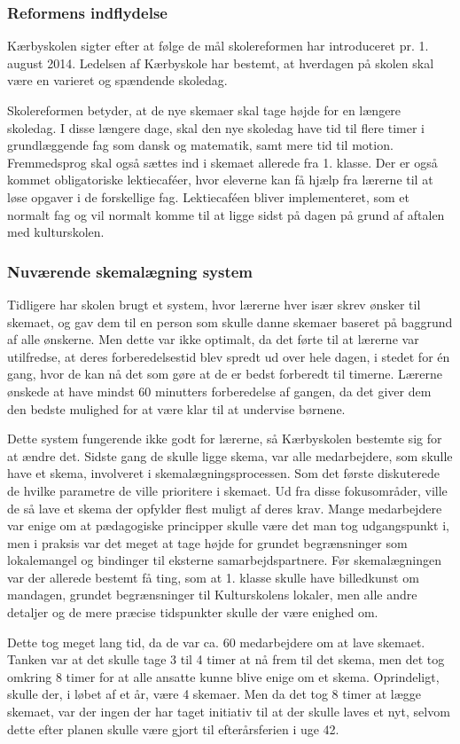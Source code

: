 \subsubsection{Reformens indflydelse}
\label{Reformens_indflydelse}
Kærbyskolen sigter efter at følge de mål skolereformen har introduceret pr. 1. august 2014. Ledelsen af Kærbyskole har bestemt, at hverdagen på skolen skal være en varieret og spændende skoledag.

Skolereformen betyder, at de nye skemaer skal tage højde for en længere skoledag. I disse længere dage, skal den nye skoledag have tid til flere timer i grundlæggende fag som dansk og matematik, samt mere tid til motion. Fremmedsprog skal også sættes ind i skemaet allerede fra 1. klasse. Der er også kommet obligatoriske lektiecaf\'eer, hvor eleverne kan få hjælp fra lærerne til at løse opgaver i de forskellige fag. Lektiecaf\'een bliver implementeret, som et normalt fag og vil normalt komme til at ligge sidst på dagen på grund af aftalen med kulturskolen\cite{kaerby_skolereform}.

\subsubsection {Nuværende skemalægning system}
Tidligere har skolen brugt et system, hvor lærerne hver især skrev ønsker til skemaet, og gav dem til en person som skulle danne skemaer baseret på baggrund af alle ønskerne. Men dette var ikke optimalt, da det førte til at lærerne var utilfredse, at deres forberedelsestid blev spredt ud over hele dagen, i stedet for én gang, hvor de kan nå det som gøre at de er bedst forberedt til timerne\cite{interview_Kaerby}. Lærerne ønskede at have mindst 60 minutters forberedelse af gangen, da det giver dem den bedste mulighed for at være klar til at undervise børnene.

Dette system fungerende ikke godt for lærerne, så Kærbyskolen bestemte sig for at ændre det. Sidste gang de skulle ligge skema, var alle medarbejdere, som skulle have et skema, involveret i skemalægningsprocessen. Som det første diskuterede de hvilke parametre de ville prioritere i skemaet. Ud fra disse fokusområder, ville de så lave et skema der opfylder flest muligt af deres krav. Mange medarbejdere var enige om at pædagogiske principper skulle være det man tog udgangspunkt i, men i praksis var det meget at tage højde for grundet begrænsninger som lokalemangel og bindinger til eksterne samarbejdspartnere. Før skemalægningen var der allerede bestemt få ting, som at 1. klasse skulle have billedkunst om mandagen, grundet begrænsninger til Kulturskolens lokaler, men alle andre detaljer og de mere præcise tidspunkter skulle der være enighed om. 

Dette tog meget lang tid, da de var ca. 60 medarbejdere om at lave skemaet. Tanken var at det skulle tage 3 til 4 timer at nå frem til det skema, men det tog omkring 8 timer for at alle ansatte kunne blive enige om et skema. Oprindeligt, skulle der, i løbet af et år, være 4 skemaer. Men da det tog 8 timer at lægge skemaet, var der ingen der har taget initiativ til at der skulle laves et nyt, selvom dette efter planen skulle være gjort til efterårsferien i uge 42. 


